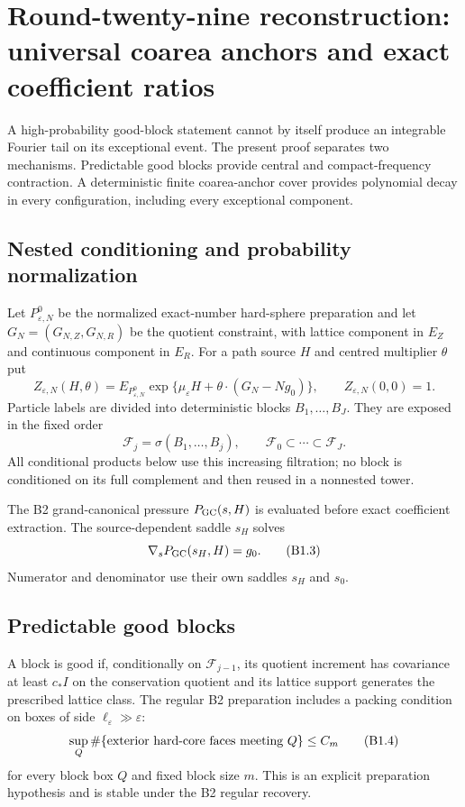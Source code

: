 \section{Round-twenty-nine reconstruction: universal coarea anchors and exact coefficient ratios}
\label{sec:r29-b1}

A high-probability good-block statement cannot by itself produce an
integrable Fourier tail on its exceptional event.  The present proof separates
two mechanisms.  Predictable good blocks provide central and compact-frequency
contraction.  A deterministic finite coarea-anchor cover provides polynomial
decay in every configuration, including every exceptional component.

\subsection{Nested conditioning and probability normalization}

Let $P^0_{\varepsilon,N}$ be the normalized exact-number hard-sphere
preparation and let $G_N=(G_{N,Z},G_{N,R})$ be the quotient constraint, with
lattice component in $E_Z$ and continuous component in $E_R$.  For a path
source $H$ and centred multiplier $\theta$ put
\[
 Z_{\varepsilon,N}(H,\theta)
 =E_{P^0_{\varepsilon,N}}
   \exp\{\mu_\varepsilon H+\theta\cdot(G_N-Ng_0)\},
 \qquad Z_{\varepsilon,N}(0,0)=1.                        \tag{B1.1}
\]
Particle labels are divided into deterministic blocks $B_1,\ldots,B_J$.
They are exposed in the fixed order
\[
 \mathcal F_j=\sigma(B_1,\ldots,B_j),
 \qquad \mathcal F_0\subset\cdots\subset\mathcal F_J.    \tag{B1.2}
\]
All conditional products below use this increasing filtration; no block is
conditioned on its full complement and then reused in a nonnested tower.

The B2 grand-canonical pressure $P_{\rm GC}(s,H)$ is evaluated before exact
coefficient extraction.  The source-dependent saddle $s_H$ solves
\[
 \nabla_sP_{\rm GC}(s_H,H)=g_0.                           \tag{B1.3}
\]
Numerator and denominator use their own saddles $s_H$ and $s_0$.

\subsection{Predictable good blocks}

A block is good if, conditionally on $\mathcal F_{j-1}$, its quotient
increment has covariance at least $c_*I$ on the conservation quotient and its
lattice support generates the prescribed lattice class.  The regular B2
preparation includes a packing condition on boxes of side
$\ell_\varepsilon\gg\varepsilon$:
\[
 \sup_Q\#\{\hbox{exterior hard-core faces meeting }Q\}\le C_m           \tag{B1.4}
\]
for every block box $Q$ and fixed block size $m$.  This is an explicit
preparation hypothesis and is stable under the B2 regular recovery.

